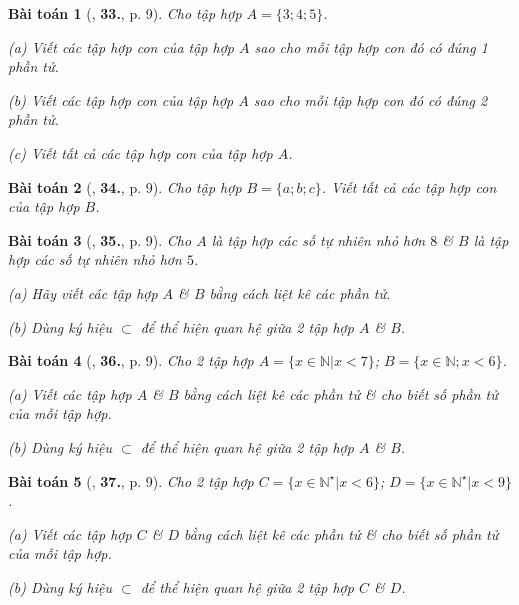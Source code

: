 \documentclass{article}
\numberwithin{equation}{section}
\newtheorem{baitoan}{Bài toán}[section]
\begin{document}
\begin{baitoan}[\cite{Trong_Toan_6_2021}, \textbf{33.}, p. 9]
	Cho tập hợp $A = \{3;4;5\}$.
	\begin{enumerate*}
		\item[(a)] Viết các tập hợp con của tập hợp $A$ sao cho mỗi tập hợp con đó có đúng 1 phần tử.
		\item[(b)] Viết các tập hợp con của tập hợp $A$ sao cho mỗi tập hợp con đó có đúng 2 phần tử.
		\item[(c)] Viết tất cả các tập hợp con của tập hợp $A$.
	\end{enumerate*}
\end{baitoan}
	
\begin{baitoan}[\cite{Trong_Toan_6_2021}, \textbf{34.}, p. 9]
	Cho tập hợp $B = \{a;b;c\}$. Viết tất cả các tập hợp con của tập hợp $B$.		
\end{baitoan}

\begin{baitoan}[\cite{Trong_Toan_6_2021}, \textbf{35.}, p. 9]
	Cho $A$ là tập hợp các số tự nhiên nhỏ hơn $8$ \& $B$ là tập hợp các số tự nhiên nhỏ hơn $5$.
	\begin{enumerate*}
		\item[(a)] Hãy viết các tập hợp $A$ \& $B$ bằng cách liệt kê các phần tử.
		\item[(b)] Dùng ký hiệu $\subset$ để thể hiện quan hệ giữa 2 tập hợp $A$ \& $B$.
	\end{enumerate*}
\end{baitoan}

\begin{baitoan}[\cite{Trong_Toan_6_2021}, \textbf{36.}, p. 9]
	Cho 2 tập hợp $A = \{x\in\mathbb{N}|x < 7\}$; $B = \{x\in\mathbb{N};x < 6\}$.
	\begin{enumerate*}
		\item[(a)] Viết các tập hợp $A$ \& $B$ bằng cách liệt kê các phần tử \& cho biết số phần tử của mỗi tập hợp.
		\item[(b)] Dùng ký hiệu $\subset$ để thể hiện quan hệ giữa 2 tập hợp $A$ \& $B$.
	\end{enumerate*} 
\end{baitoan}

\begin{baitoan}[\cite{Trong_Toan_6_2021}, \textbf{37.}, p. 9]
	Cho 2 tập hợp $C = \{x\in\mathbb{N}^\star|x < 6\}$; $D = \{x\in\mathbb{N}^\star|x < 9\}$.
	\begin{enumerate*}
		\item[(a)] Viết các tập hợp $C$ \& $D$ bằng cách liệt kê các phần tử \& cho biết số phần tử của mỗi tập hợp.
		\item[(b)] Dùng ký hiệu $\subset$ để thể hiện quan hệ giữa 2 tập hợp $C$ \& $D$.
	\end{enumerate*} 
\end{baitoan}
\end{document}
